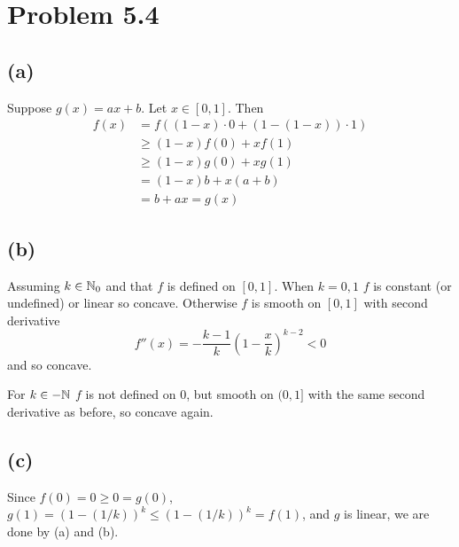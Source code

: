 \section{Problem 5.4}

\subsection{(a)}
Suppose $g(x) = ax + b$. Let $x \in [0,1]$. Then
\begin{align*}
  f(x) &= f((1-x)\cdot 0 + (1-(1-x))\cdot 1)
  \\ &\geq (1-x)f(0) + x f(1)
  \\ &\geq (1-x)g(0) + x g(1)
  \\ &= (1-x) b + x(a+b)
  \\ &= b+ax = g(x)
\end{align*}

\subsection{(b)}
Assuming $k \in \mathbb{N}_0$ and that $f$ is defined on $[0,1]$.
When $k=0,1$ $f$ is constant (or undefined) or linear so concave.
Otherwise $f$ is smooth on $[0,1]$ with second derivative
\[ f''(x) = -\frac{k-1}{k} \left( 1 - \frac{x}{k} \right)^{k-2} < 0 \]
and so concave.

For $k \in -\mathbb{N}$ $f$ is not defined on $0$,
but smooth on $(0,1]$ with the same second derivative as before,
so concave again.

\subsection{(c)}
Since $f(0) = 0 \geq 0 = g(0)$,
$g(1) = (1 - (1/k))^k \leq (1 - (1/k))^k = f(1)$,
and $g$ is linear,
we are done by (a) and (b).
